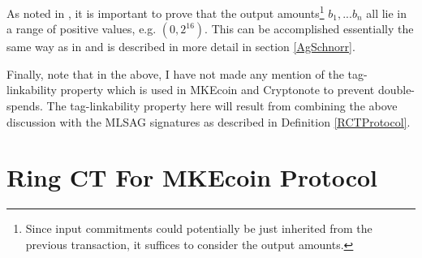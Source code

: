 \documentclass[12pt,oneside,english]{amsart}
\numberwithin{equation}{section}
\numberwithin{figure}{section}
\theoremstyle{plain}
\theoremstyle{plain}
\theoremstyle{remark}
\theoremstyle{plain}
\theoremstyle{remark}
\theoremstyle{remark}
\theoremstyle{plain}
\theoremstyle{definition}
\begin{document}
As noted in \cite{GM}, it is important to prove that the output amounts\footnote{Since input commitments could potentially be just inherited from the
previous transaction, it suffices to consider the output amounts.}
$b_{1},...b_{n}$ all lie in a range of positive values, e.g. $(0,2^{16}).$
This can be accomplished essentially the same way as in \cite{GM} and is described in more detail in section \ref{AgSchnorr}.
\begin{comment}
\begin{itemize}
\item Write each output amount $b_i$ as 
\[
 b_i = \delta_{ij}
\]

\item Prove first $C_{out-i}^{\left(j\right)}\in\left\{ 0,2^{j}\right\} $
for all $j\in\left\{ 0,1,...,16\right\} .$ This is done as in \cite{GM}:
for example, $C_{out-i}^{0}=y_{i}^{0}G+b_{i}^{0}H$ where $b_{i}^{0}\in\left\{ 0,1\right\} $.
Let 
\[
C_{out-i}^{\prime0}=C_{out-i}^{0}-H=y_{i}G+b_{i}^{0}H-H
\]
 so that if $b_{i}^{0}=0$, then $C_{out}^{\prime0}=y_{i}G$ and if
$b_{i}^{0}=1$, then $C_{out}^{0}=y_{i}G$, and in either case, the
ring signature on $\left\{ C_{out}^{0},C_{out}^{\prime0}\right\} $
can be signed for. 
\item By carefully choosing the blinding values (i.e. ensuring that $\sum_{j}y_{i}^{j}=y_{i}$ for each $j$), define 
\[
C_{out-i}=\sum_{j=1}^{16}C_{out-i}^{\left(j\right)}
\]
\item By homomorphicity of the commitments, $b_{i}=\sum_{j}\delta_{ji}2^{j}$,
where $\delta_{ji}$ is the $j^{th}$ digit in the binary expansion
of $b_{i}$. 
\end{itemize}
Thus in total, by the above, the sum of inputs into a transaction
equals the outputs, yet the specific input (and it's index!) is hidden.
In addition, the outputs are positive values. 
\end{comment}

Finally, note that in the above, I have not made any mention of the tag-linkability property which is used in MKEcoin and Cryptonote to prevent double-spends. The tag-linkability property here will result from combining the above discussion with the MLSAG signatures as described in Definition \ref{RCTProtocol}.


\section{\label{sec:Ring-CT-ForMonero}Ring CT For MKEcoin Protocol}
\end{document}

